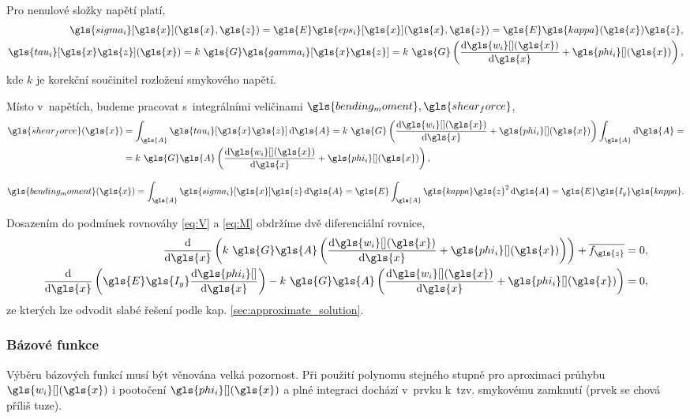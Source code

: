 Pro nenulové složky napětí platí,
\begin{align}
    \gls{sigma_i}[\gls{x}](\gls{x}, \gls{z}) = \gls{E} \gls{eps_i}[\gls{x}](\gls{x}, \gls{z}) = \gls{E}\gls{kappa}(\gls{x}) \gls{z},\\
    \gls{tau_i}[\gls{x}\gls{z}](\gls{x}) = k~\gls{G} \gls{gamma_i}[\gls{x}\gls{z}] = k~\gls{G} \left(\dv{\gls{w_i}[ ](\gls{x})}{\gls{x}} + \gls{phi_i}[ ](\gls{x})\right),
\end{align}
kde $k$ je korekční součinitel rozložení smykového napětí.

Místo v~napětích, budeme pracovat s~integrálními veličinami $\gls{bending_moment}, \gls{shear_force}$,
\begin{equation}
    \begin{split} \label{eq:tim_shear_force}
        \gls{shear_force}(\gls{x}) 
        & = 
        \int_{\gls{A}} \gls{tau_i}[\gls{x}\gls{z}] \dd{\gls{A}}
        = k~\gls{G} \left(\dv{\gls{w_i}[ ](\gls{x})}{\gls{x}} + \gls{phi_i}[ ](\gls{x}) \right) \int_{\gls{A}} \dd{\gls{A}} = \\
        & =
        k~\gls{G} \gls{A}  \left(\dv{\gls{w_i}[ ](\gls{x})}{\gls{x}} + \gls{phi_i}[ ](\gls{x}) \right),
    \end{split}
\end{equation}

\begin{equation}    
    \gls{bending_moment}(\gls{x})
    =
    \int_{\gls{A}} \gls{sigma_i}[\gls{x}] \gls{z} \dd{\gls{A}}
    =
    \gls{E} \int_{\gls{A}} \gls{kappa} \gls{z}^2 \dd{\gls{A}}
    =
    \gls{E} \gls{I_y} \gls{kappa}.
\end{equation}

Dosazením do podmínek rovnováhy \ref{eq:V} a \ref{eq:M} obdržíme dvě diferenciální rovnice,
\begin{align}
    \dv{\gls{x}} \left( k~\gls{G} \gls{A}  \left(\dv{\gls{w_i}[ ](\gls{x})}{\gls{x}} + \gls{phi_i}[ ](\gls{x}) \right) \right) + \overline{f_{\gls{z}}} = 0, \\
    \dv{\gls{x}} \left( \gls{E} \gls{I_y} \dv{\gls{phi_i}[ ]}{\gls{x}} \right) - k~\gls{G} \gls{A}  \left(\dv{\gls{w_i}[ ](\gls{x})}{\gls{x}} + \gls{phi_i}[ ](\gls{x}) \right) = 0,
\end{align}
ze kterých lze odvodit slabé řešení podle kap. \ref{sec:approximate_solution}. 

\subsubsection*{Bázové funkce}
Výběru bázových funkcí musí být věnována velká pozornost. Při použití polynomu stejného stupně pro aproximaci průhybu $\gls{w_i}[ ](\gls{x})$ i pootočení $\gls{phi_i}[ ](\gls{x})$ a plné integraci dochází v~prvku k~tzv. smykovému zamknutí (prvek se chová příliš tuze).


